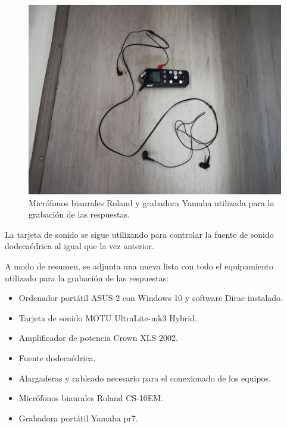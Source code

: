 \documentclass[11pt,a4paper,twoside]{book}
\begin{document}
            \begin{figure}
                \includegraphics[scale=0.3]{../imagenes/MicroBi.jpg}
                \centering
                \caption{Micrófonos biaurales Roland y grabadora Yamaha utilizada para la grabación de las respuestas.}
                \label{fig:microsBi}
            \end{figure}
                
            La tarjeta de sonido se sigue utilizando para controlar la fuente de sonido dodecaédrica al igual que la vez anterior.
                
            A modo de resumen, se adjunta una nueva lista con todo el equipamiento utilizado para la grabación de las respuestas:
                
            \begin{itemize}
                \item Ordenador portátil ASUS 2 con Windows 10 y software Dirac instalado.
	            \item Tarjeta de sonido MOTU UltraLite-mk3 Hybrid.
	            \item Amplificador de potencia Crown XLS 2002.
	            \item Fuente dodecaédrica.
	            \item Alargaderas y cableado necesario para el conexionado de los equipos.
	            \item Micrófonos biaurales Roland CS-10EM.
	            \item Grabadora portátil Yamaha pr7.
            \end{itemize}
                
\end{document}
